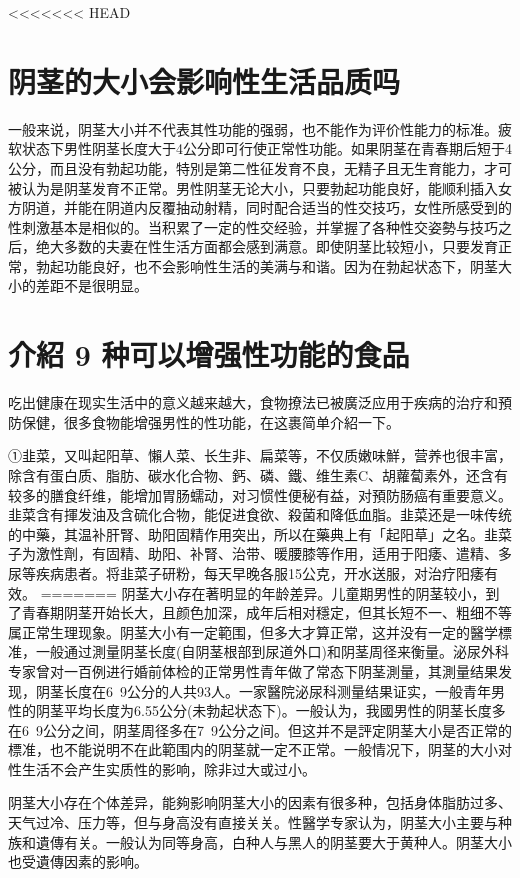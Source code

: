 \documentclass[12pt,UTF8]{ctexbook}
\begin{document}
<<<<<<< HEAD

\section{阴茎的大小会影响性生活品质吗}

一般来说，阴茎大小并不代表其性功能的强弱，也不能作为评价性能力的标准。疲软状态下男性阴茎长度大于4公分即可行使正常性功能。如果阴茎在青春期后短于4公分，而且没有勃起功能，特別是第二性征发育不良，无精子且无生育能力，才可被认为是阴茎发育不正常。男性阴茎无论大小，只要勃起功能良好，能顺利插入女方阴道，并能在阴道内反覆抽动射精，同时配合适当的性交技巧，女性所感受到的性刺激基本是相似的。当积累了一定的性交经验，并掌握了各种性交姿勢与技巧之后，绝大多数的夫妻在性生活方面都会感到满意。即使阴茎比较短小，只要发育正常，勃起功能良好，也不会影响性生活的美满与和谐。因为在勃起状态下，阴茎大小的差距不是很明显。

\section{介紹 9 种可以增强性功能的食品}

吃出健康在现实生活中的意义越来越大，食物撩法已被廣泛应用于疾病的治疗和預防保健，很多食物能增强男性的性功能，在这裹简单介紹一下。

①韭菜，又叫起阳草、懶人菜、长生非、扁菜等，不仅质嫩味鮮，营养也很丰富，除含有蛋白质、脂肪、碳水化合物、鈣、磷、鐵、维生素C、胡蘿蔔素外，还含有较多的膳食纤维，能增加胃肠蠕动，对习惯性便秘有益，对預防肠癌有重要意义。韭菜含有揮发油及含硫化合物，能促进食欲、殺菌和降低血脂。韭菜还是一味传统的中藥，其温补肝腎、助阳固精作用突出，所以在藥典上有「起阳草」之名。韭菜子为激性劑，有固精、助阳、补腎、治带、暖腰膝等作用，适用于阳痿、遣精、多尿等疾病患者。将韭菜子研粉，每天早晚各服15公克，开水送服，对治疗阳痿有效。
=======
阴茎大小存在著明显的年龄差异。儿童期男性的阴茎较小，到了青春期阴茎开始长大，且颜色加深，成年后相对穩定，但其长短不一、粗细不等属正常生理现象。阴茎大小有一定範围，但多大才算正常，这并没有一定的醫学標准，一般通过測量阴茎长度(自阴茎根部到尿道外口)和阴茎周径来衡量。泌尿外科专家曾对一百例进行婚前体检的正常男性青年做了常态下阴茎測量，其測量结果发现，阴茎长度在6~9公分的人共93人。一家醫院泌尿科测量结果证实，一般青年男性的阴茎平均长度为6.55公分(未勃起状态下)。一般认为，我國男性的阴茎长度多在6~9公分之间，阴茎周径多在7~9公分之间。但这并不是評定阴茎大小是否正常的標准，也不能说明不在此範围内的阴茎就一定不正常。一般情况下，阴茎的大小对性生活不会产生实质性的影响，除非过大或过小。

阴茎大小存在个体差异，能夠影响阴茎大小的因素有很多种，包括身体脂肪过多、天气过冷、压力等，但与身高没有直接关关。性醫学专家认为，阴茎大小主要与种族和遺傳有关。一般认为同等身高，白种人与黑人的阴茎要大于黄种人。阴茎大小也受遺傳因素的影响。
\end{document}

